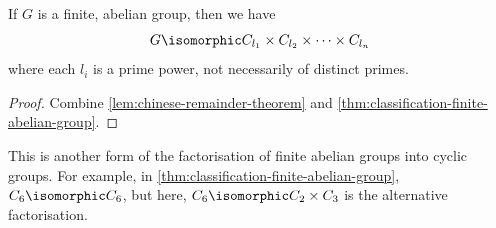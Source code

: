 \begin{corollary}
    \label{cor:finite-abelian-groups-prime-powers}
    If \(G\) is a finite, abelian group, then we have
    \[
        G \isomorphic C_{l_1} \times C_{l_2} \times \cdots \times C_{l_n}
    \]
    where each \(l_i\) is a prime power, not necessarily of distinct primes.
\end{corollary}

\begin{proof}
    Combine \autoref{lem:chinese-remainder-theorem} and \autoref{thm:classification-finite-abelian-group}.
\end{proof}

This is another form of the factorisation of finite abelian groups into cyclic groups. For example, in \autoref{thm:classification-finite-abelian-group}, \(C_6 \isomorphic C_6\), but here, \(C_6 \isomorphic C_2 \times C_3\) is the alternative factorisation.